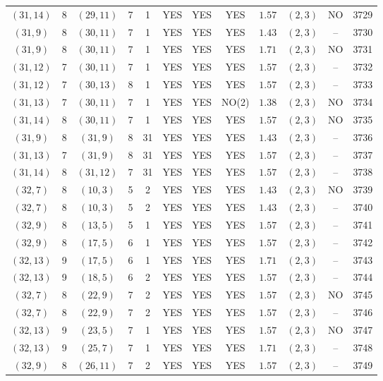 \begin{longtable}{|c|c|c|c|c|c|c|c|c|c|c|c|}
$(31,14)$ & 8 & $(29,11)$ & 7 & 1 & YES & YES & YES & $1.57$ & $(2,3)$ & NO & 3729\\
$(31,9)$ & 8 & $(30,11)$ & 7 & 1 & YES & YES & YES & $1.43$ & $(2,3)$ & -- & 3730\\
$(31,9)$ & 8 & $(30,11)$ & 7 & 1 & YES & YES & YES & $1.71$ & $(2,3)$ & NO & 3731\\
$(31,12)$ & 7 & $(30,11)$ & 7 & 1 & YES & YES & YES & $1.57$ & $(2,3)$ & -- & 3732\\
$(31,12)$ & 7 & $(30,13)$ & 8 & 1 & YES & YES & YES & $1.57$ & $(2,3)$ & -- & 3733\\
$(31,13)$ & 7 & $(30,11)$ & 7 & 1 & YES & YES & NO(2) & $1.38$ & $(2,3)$ & NO & 3734\\
$(31,14)$ & 8 & $(30,11)$ & 7 & 1 & YES & YES & YES & $1.57$ & $(2,3)$ & NO & 3735\\
$(31,9)$ & 8 & $(31,9)$ & 8 & 31 & YES & YES & YES & $1.43$ & $(2,3)$ & -- & 3736\\
$(31,13)$ & 7 & $(31,9)$ & 8 & 31 & YES & YES & YES & $1.57$ & $(2,3)$ & -- & 3737\\
$(31,14)$ & 8 & $(31,12)$ & 7 & 31 & YES & YES & YES & $1.57$ & $(2,3)$ & -- & 3738\\
$(32,7)$ & 8 & $(10,3)$ & 5 & 2 & YES & YES & YES & $1.43$ & $(2,3)$ & NO & 3739\\
$(32,7)$ & 8 & $(10,3)$ & 5 & 2 & YES & YES & YES & $1.43$ & $(2,3)$ & -- & 3740\\
$(32,9)$ & 8 & $(13,5)$ & 5 & 1 & YES & YES & YES & $1.57$ & $(2,3)$ & -- & 3741\\
$(32,9)$ & 8 & $(17,5)$ & 6 & 1 & YES & YES & YES & $1.57$ & $(2,3)$ & -- & 3742\\
$(32,13)$ & 9 & $(17,5)$ & 6 & 1 & YES & YES & YES & $1.71$ & $(2,3)$ & -- & 3743\\
$(32,13)$ & 9 & $(18,5)$ & 6 & 2 & YES & YES & YES & $1.57$ & $(2,3)$ & -- & 3744\\
$(32,7)$ & 8 & $(22,9)$ & 7 & 2 & YES & YES & YES & $1.57$ & $(2,3)$ & NO & 3745\\
$(32,7)$ & 8 & $(22,9)$ & 7 & 2 & YES & YES & YES & $1.57$ & $(2,3)$ & -- & 3746\\
$(32,13)$ & 9 & $(23,5)$ & 7 & 1 & YES & YES & YES & $1.57$ & $(2,3)$ & NO & 3747\\
$(32,13)$ & 9 & $(25,7)$ & 7 & 1 & YES & YES & YES & $1.71$ & $(2,3)$ & -- & 3748\\
$(32,9)$ & 8 & $(26,11)$ & 7 & 2 & YES & YES & YES & $1.57$ & $(2,3)$ & -- & 3749\\

\end{longtable}
